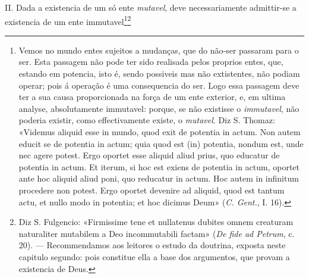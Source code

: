 II. Dada a existencia de um só ente \emph{mutavel}, deve necessariamente admittir-se a existencia de um ente immutavel\footnote{Vemos no mundo entes sujeitos a mudanças, que do não-ser passaram para o ser. Esta passagem não pode ter sido realisada pelos proprios entes, que, estando em potencia, isto é, sendo possiveis mas não extistentes, não podiam operar; pois á operação é uma consequencia do ser. Logo essa passagem deve ter a sua causa proporcionada na força de um ente exterior, e, em ultima analyse, absolutamente immutavel: porque, se não existisse o \emph{immutavel}, não poderia existir, como effectivamente existe, o \emph{mutavel}. Diz S. Thomaz: «Videmus aliquid esse in mundo, quod exit de potentia in actum. Non autem educit se de potentia in actum; quia quod est (in) potentia, nondum est, unde nec agere potest. Ergo oportet esse aliquid aliud prius, quo educatur de potentia in actum. Et iterum, si hoc est exiens de potentia in actum, oportet ante hoc aliquid aliud poni, quo reducatur in actum. Hoc autem in infinitum procedere non potest. Ergo oportet devenire ad aliquid, quod est tantum actu, et nullo modo in potentia; et hoc dicimus Deum» (\emph{C. Gent.}, I. 16).}\footnote{Diz S. Fulgencio: «Firmissime tene et nullatenus dubites omnem creaturam naturaliter mutabilem a Deo incommutabili factam» (\emph{De fide ad Petrum}, c. 20). --- Recommendamos aos leitores o estudo da doutrina, exposta neste capitulo segundo: pois constitue ella a base dos argumentos, que provam a existencia de Deus.}
